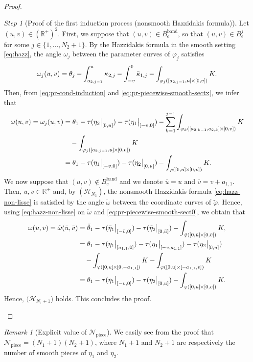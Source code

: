 \documentclass{article}
\newcommand{\PLH}{{\mkern-1mu\times\mkern-1mu}}
\newcommand{\Times}{\PLH}
\newcommand{\R}{\mathbb{R}}
\newcommand{\ko}{\kappa}
\newcommand{\halfP}{B}
\newcommand{\Npiece}{\mathcal{N}_{\mathrm{piece}}}
\newcommand{\Beband}{B_e^{\mathrm{band}}}
\renewcommand{\H}{\mathcal{H}}
\theoremstyle{remark}
\newtheorem{remarkE}[theorem]{Remark}
\theoremstyle{prpart}
\newtheorem{proofpart}{Step}
\renewcommand{\H}{\mathcal{H}}
\begin{document}
\begin{proof}
\begin{proofpart}[Proof of the first induction process (nonsmooth Hazzidakis formula)]
  Let $(u, v)\in (\R^+)^2$. First, we suppose that $(u, v)\in \Beband$, so that $(u, v)\in \halfP^j_e$ for some $j\in \{1,...,N_2+1\}$. By the Hazzidakis formula in the smooth setting \eqref{eq:hazz}, the angle $\omega_j$ between the parameter curves of $\varphi_j$ satisfies
\begin{equation}\label{eq:pr-piecewise-smooth-sectx}
  \omega_j(u,v) = \theta_j - \int_{a_{2,j-1}}^u\ko_{2,j} - \int_{-v}^0 \tilde\ko_{1,j} - \int_{\varphi_j([a_{2,j-1},u]\Times[0,v])}K.
\end{equation}
Then, from \eqref{eq:pr-cond-induction} and \eqref{eq:pr-piecewise-smooth-sectx}, we infer that
\begin{align*}
  \omega(u,v) = \omega_j(u,v) &= \theta_1 - \tau(\eta_2\big|_{[0,u]}) - \tau(\eta_1\big|_{[-v,0]})  - \sum_{k=1}^{j-1}\int_{\varphi_k([a_{2,k-1},a_{2,k}]\Times[0,v])}K 
  \\
  &\quad- \int_{\varphi_j([a_{2,j-1},u]\Times[0,v])}K\\
  &= \theta_1 - \tau(\eta_1\big|_{[-v,0]}) - \tau(\eta_2\big|_{[0,u]})  - \int_{\varphi([0,u]\Times[0,v])}K.
\end{align*}
We now suppose that $(u,v)\notin \Beband$ and we denote $\bar u= u$ and $\bar v=v+a_{1,1}$. Then, $\bar u, \bar v\in\R^+$ and, by $(\H_{N_1})$,  the nonsmooth Hazzidakis formula \eqref{eq:hazz-non-lisse} is satisfied by the angle $\tilde\omega$ between the coordinate curves of $\tilde\varphi$. Hence, using \eqref{eq:hazz-non-lisse} on $\tilde\omega$ and \eqref{eq:pr-piecewise-smooth-sect0}, we obtain that
\begin{align*}
  \omega(u,v) = \tilde\omega(\bar u,\bar v) &= \tilde \theta_1 - \tau(\tilde \eta_1\big|_{[-\bar v,0]}) - \tau(\tilde\eta_2\big|_{[0,\bar u]})  - \int_{\tilde\varphi([0,\bar u]\Times[0,\bar v])}K,  \\
  &= \theta_1 - \tau(\eta_1\big|_{[a_{1,1},0]}) - \tau(\eta_1\big|_{[-v,a_{1,1}]}) - \tau(\eta_2\big|_{[0,u]})\\
  &\quad- \int_{\varphi([0,u]\Times[0,-a_{1,1}])}K - \int_{\varphi([0,u]\Times[-a_{1,1},v])}K\\
  &= \theta_1 - \tau(\eta_1\big|_{[-v,0]}) - \tau(\eta_2\big|_{[0,u]}) - \int_{\varphi([0,u]\Times[0,v])}K.
\end{align*}
Hence, $(\H_{N_1+1}$) holds. This concludes the proof.
\end{proofpart}
\end{proof}
\begin{remarkE}[Explicit value of $\Npiece$]
  We easily see from the proof that $\Npiece = (N_1+1)(N_2+1)$, where $N_1+1$ and $N_2+1$ are respectively the number of smooth pieces of $\eta_1$ and $\eta_2$.
\end{remarkE}
\end{document}
